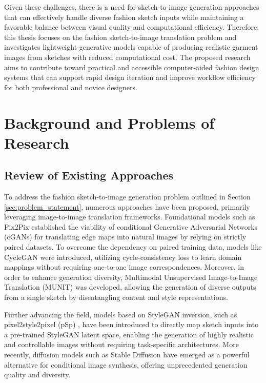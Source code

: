 \documentclass[../main.tex]{subfiles}
\begin{document}
Given these challenges, there is a need for sketch-to-image generation approaches that can effectively handle diverse fashion sketch inputs while maintaining a favorable balance between visual quality and computational efficiency. Therefore, this thesis focuses on the fashion sketch-to-image translation problem and investigates lightweight generative models capable of producing realistic garment images from sketches with reduced computational cost. The proposed research aims to contribute toward practical and accessible computer-aided fashion design systems that can support rapid design iteration and improve workflow efficiency for both professional and novice designers.

\section{Background and Problems of Research} 
\label{sec:background}

\subsection{Review of Existing Approaches}
To address the fashion sketch-to-image generation problem outlined in Section \ref{sec:problem_statement}, numerous approaches have been proposed, primarily leveraging image-to-image translation frameworks. Foundational models such as Pix2Pix \cite{isola2017image} established the viability of conditional Generative Adversarial Networks (cGANs) for translating edge maps into natural images by relying on strictly paired datasets. To overcome the dependency on paired training data, models like CycleGAN \cite{zhu2017unpaired} were introduced, utilizing cycle-consistency loss to learn domain mappings without requiring one-to-one image correspondences. Moreover, in order to enhance generation diversity, Multimodal Unsupervised Image-to-Image Translation (MUNIT) \cite{huang2018multimodal} was developed, allowing the generation of diverse outputs from a single sketch by disentangling content and style representations.

Further advancing the field, models based on StyleGAN \cite{karras2019style} inversion, such as pixel2style2pixel (pSp) \cite{richardson2021encoding}, have been introduced to directly map sketch inputs into a pre-trained StyleGAN latent space, enabling the generation of highly realistic and controllable images without requiring task-specific architectures. More recently, diffusion models such as Stable Diffusion \cite{rombach2022high} have emerged as a powerful alternative for conditional image synthesis, offering unprecedented generation quality and diversity.
\end{document}
